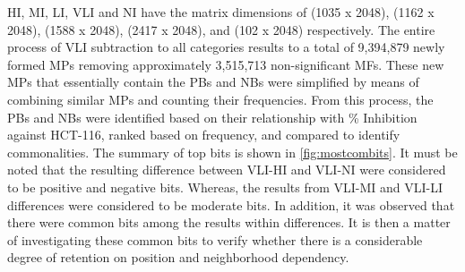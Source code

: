 HI, MI, LI, VLI and NI have the matrix dimensions of (1035 x 2048), (1162 x 2048), (1588 x 2048), (2417 x 2048), and (102 x 2048) respectively. The entire process of VLI subtraction to all categories results to a total of 9,394,879 newly formed MPs removing approximately 3,515,713 non-significant MFs. These new MPs that essentially contain the PBs and NBs were simplified by means of combining similar MPs and counting their frequencies. From this process, the PBs and NBs were identified based on their relationship with \% Inhibition against HCT-116, ranked based on frequency, and compared to identify commonalities. The summary of top bits is shown in \autoref{fig:mostcombits}. It must be noted that the resulting difference between VLI-HI and VLI-NI were considered to be positive and negative bits. Whereas, the results from VLI-MI and VLI-LI differences were considered to be moderate bits. In addition, it was observed that there were common bits among the results within differences. It is then a matter of investigating these common bits to verify whether there is a considerable degree of retention on position and neighborhood dependency.






